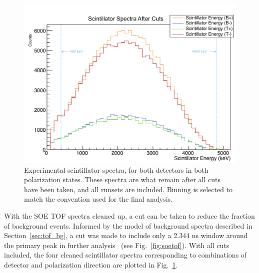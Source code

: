 \begin{figure}[h!!tb]
	\centering
	\includegraphics[width=.999\linewidth]
	{Figures/experimental_scintspectra_lin.png}
	\caption[Experimental Scintillator Spectra]{Experimental scintillator spectra, for both detectors in both polarization states.  These spectra are what remain after all cuts have been taken, and all runsets are included.  Binning is selected to match the convention used for the final analysis.}	
	\label{fig:scintspectra}
\end{figure}

With the SOE TOF spectra cleaned up, a cut can be taken to reduce the fraction of background events.  Informed by the model of background spectra described in Section~\ref{sec:tof_bg}, a cut was made to include only a 2.344 ns window around the primary peak in further analysis~ (see Fig.~\ref{fig:soetof}).  With all cuts included, the four cleaned scintillator spectra corresponding to combinations of detector and polarization direction are plotted in Fig.~\ref{fig:scintspectra}.








